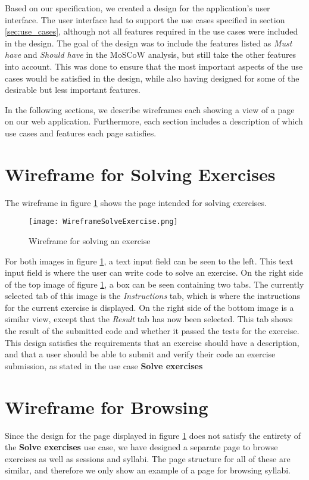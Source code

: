 Based on our specification, we created a design for the application's user interface. The user interface had to support the use cases specified in section \ref{sec:use_cases}, although not all features required in the use cases were included in the design. The goal of the design was to include the features listed as \textit{Must have} and \textit{Should have} in the MoSCoW analysis, but still take the other features into account. This was done to ensure that the most important aspects of the use cases would be satisfied in the design, while also having designed for some of the desirable but less important features.

In the following sections, we describe wireframes each showing a view of a page on our web application. Furthermore, each section includes a description of which use cases and features each page satisfies.

\section{Wireframe for Solving Exercises}
The wireframe in figure \ref{fig:wfExercise} shows the page intended for solving exercises.
\begin{figure}[H]
	\texttt{[image: WireframeSolveExercise.png]}
	\centering
	\caption{Wireframe for solving an exercise}
	\label{fig:wfExercise}
\end{figure}

For both images in figure \ref{fig:wfExercise}, a text input field can be seen to the left. This text input field is where the user can write code to solve an exercise. On the right side of the top image of figure \ref{fig:wfExercise}, a box can be seen containing two tabs. The currently selected tab of this image is the \textit{Instructions} tab, which is where the instructions for the current exercise is displayed. On the right side of the bottom image is a similar view, except that the \textit{Result} tab has now been selected. This tab shows the result of the submitted code and whether it passed the tests for the exercise. This design satisfies the requirements that an exercise should have a description, and that a user should be able to submit and verify their code an exercise submission, as stated in the use case \textbf{Solve exercises}

\section{Wireframe for Browsing}
Since the design for the page displayed in figure \ref{fig:wfExercise} does not satisfy the entirety of the \textbf{Solve exercises} use case, we have designed a separate page to browse exercises as well as sessions and syllabi. The page structure for all of these are similar, and therefore we only show an example of a page for browsing syllabi.

